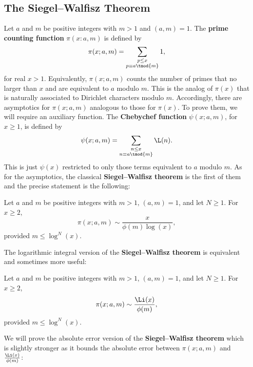     \subsection*{The Siegel–Walfisz Theorem}
      Let $a$ and $m$ be positive integers with $m > 1$ and $(a,m) = 1$. The \textbf{prime counting function} $\pi(x:a,m)$ is defined by
      \[
        \pi(x;a,m) = \sum_{\substack{p \le x \\ p \equiv a \tmod{m}}}1,
      \]
      for real $x > 1$. Equivalently, $\pi(x;a,m)$ counts the number of primes that no larger than $x$ and are equivalent to $a$ modulo $m$. This is the analog of $\pi(x)$ that is naturally associated to Dirichlet characters modulo $m$. Accordingly, there are asymptotics for $\pi(x;a,m)$ analogous to those for $\pi(x)$. To prove them, we will require an auxiliary function. The \textbf{Chebychef function} $\psi(x;a,m)$, for $x \ge 1$, is defined by
      \[
        \psi(x;a,m) = \sum_{\substack{n \le x \\ n \equiv a \tmod{m}}}\L(n).
      \]
      This is just $\psi(x)$ restricted to only those terms equivalent to $a$ modulo $m$. As for the asymptotics, the classical \textbf{Siegel–Walfisz theorem} is the first of them and the precise statement is the following:

      \begin{theorem}
        Let $a$ and $m$ be positive integers with $m > 1$, $(a,m) = 1$, and let $N \ge 1$. For $x \ge 2$,
        \[
          \pi(x;a,m) \sim \frac{x}{\phi(m)\log(x)},
        \]
        provided $m \le \log^{N}(x)$.
      \end{theorem}
      
      The logarithmic integral version of the \textbf{Siegel–Walfisz theorem} is equivalent and sometimes more useful:

      \begin{theorem}
        Let $a$ and $m$ be positive integers with $m > 1$, $(a,m) = 1$, and let $N \ge 1$. For $x \ge 2$,
        \[
          \pi(x;a,m) \sim \frac{\Li(x)}{\phi(m)},
        \]
        provided $m \le \log^{N}(x)$.
      \end{theorem}
      
      We will prove the absolute error version of the \textbf{Siegel–Walfisz theorem} which is slightly stronger as it bounds the absolute error between $\pi(x;a,m)$ and $\frac{\Li(x)}{\phi(m)}$:

